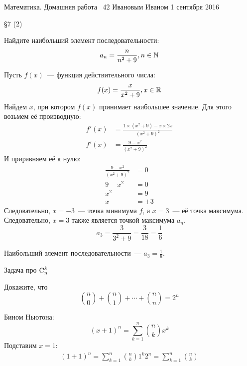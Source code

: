 \documentclass[12pt,a4paper,oneside]{article}
\begin{document}
\homework
{Математика. Домашняя работа \No~42}%
{Ивановым Иваном}%
{1 сентября 2016}%

\begin{definitions}
\DefineNaturalNumberSet
\DefineNaturalNumberSetWithIndex
\DefineNChooseK
\end{definitions}

\begin{problem}{\S7  (2)}

\Statement
Найдите наибольший элемент последовательности:
\begin{equation}
a_n = \frac n {n^2+9}, n \in \mathbb N
\end{equation}

\Solution
Пусть $f(x)$~--- функция действительного числа:
$$
f(x) = \frac x {x^2+9}, x \in \mathbb R
$$
Найдем $x$, при котором $f(x)$ принимает наибольшее значение. Для этого возьмем её производную:
\begin{align*}
f'(x) &= \frac{1\times(x^2+9)-x\times2x}{(x^2+9)^2} \\
f'(x) &= \frac{9-x^2}{(x^2+9)^2}
\end{align*}
И приравняем её к нулю:
\begin{align*}
\frac{9-x^2}{(x^2+9)^2} &= 0 \\
9-x^2 &= 0 \\
x^2 &= 9 \\
x &= \pm 3
\end{align*}
Следовательно, $x = -3$~--- точка минимума $f$, а $x = 3$~--- её точка максимума.
Следовательно, $x = 3$ также является точкой максимума $a_n$.
$$
a_3 = \frac 3 {3^2+9} = \frac 3 {18} = \frac 1 6
$$

\Answer
Наибольший элемент последовательности~--- $a_3 = \frac 1 6$.

\end{problem}
\begin{problem}{Задача про $\operatorname{C}_n^k$}

\Statement
Докажите, что
$$
{n \choose 0} + {n \choose 1} + \cdots + {n \choose n} = 2^n
$$

\Proof
Бином Ньютона:
$$
(x+1)^n = \sum_{k=1}^n {n \choose k} x^k
$$
Подставим $x = 1$:
\begin{align*}
(1+1)^n = \sum_{k=1}^n {n \choose k} 1^k
2^n = \sum_{k=1}^n {n \choose k}
\end{align*}
\QED

\end{problem}
\end{document}
